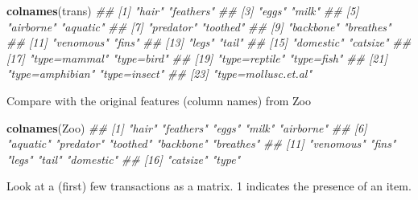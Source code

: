 \documentclass[
  notitlepage]{book}
\newenvironment{Shaded}{\begin{snugshade}}{\end{snugshade}}
\newcommand{\CommentTok}[1]{\textcolor[rgb]{0.56,0.35,0.01}{\textit{#1}}}
\newcommand{\KeywordTok}[1]{\textcolor[rgb]{0.13,0.29,0.53}{\textbf{#1}}}
\newcommand{\NormalTok}[1]{#1}
\begin{document}
\begin{Shaded}
\begin{Highlighting}[]
\KeywordTok{colnames}\NormalTok{(trans)}
\CommentTok{\#\#  [1] "hair"               "feathers"          }
\CommentTok{\#\#  [3] "eggs"               "milk"              }
\CommentTok{\#\#  [5] "airborne"           "aquatic"           }
\CommentTok{\#\#  [7] "predator"           "toothed"           }
\CommentTok{\#\#  [9] "backbone"           "breathes"          }
\CommentTok{\#\# [11] "venomous"           "fins"              }
\CommentTok{\#\# [13] "legs"               "tail"              }
\CommentTok{\#\# [15] "domestic"           "catsize"           }
\CommentTok{\#\# [17] "type=mammal"        "type=bird"         }
\CommentTok{\#\# [19] "type=reptile"       "type=fish"         }
\CommentTok{\#\# [21] "type=amphibian"     "type=insect"       }
\CommentTok{\#\# [23] "type=mollusc.et.al"}
\end{Highlighting}
\end{Shaded}

Compare with the original features (column names) from Zoo

\begin{Shaded}
\begin{Highlighting}[]
\KeywordTok{colnames}\NormalTok{(Zoo)}
\CommentTok{\#\#  [1] "hair"     "feathers" "eggs"     "milk"     "airborne"}
\CommentTok{\#\#  [6] "aquatic"  "predator" "toothed"  "backbone" "breathes"}
\CommentTok{\#\# [11] "venomous" "fins"     "legs"     "tail"     "domestic"}
\CommentTok{\#\# [16] "catsize"  "type"}
\end{Highlighting}
\end{Shaded}

Look at a (first) few transactions as a matrix. 1 indicates the presence
of an item.
\end{document}
